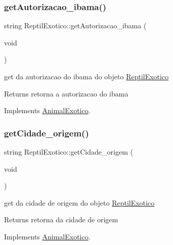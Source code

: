 \subsubsection{\texorpdfstring{getAutorizacao\_ibama()}{getAutorizacao\_ibama()}}
{\footnotesize\ttfamily string Reptil\+Exotico\+::get\+Autorizacao\+\_\+ibama (\begin{DoxyParamCaption}\item[{void}]{ }\end{DoxyParamCaption})\hspace{0.3cm}{\ttfamily [virtual]}}



get da autorizacao do ibama do objeto \mbox{\hyperlink{class_reptil_exotico}{Reptil\+Exotico}} 

\begin{DoxyReturn}{Returns}
retorna a autorizacao do ibama 
\end{DoxyReturn}


Implements \mbox{\hyperlink{class_animal_exotico}{Animal\+Exotico}}.

\mbox{\label{class_reptil_exotico_af1b3d94b7d6ca00f327a67b3e21a6eff}} 
\subsubsection{\texorpdfstring{getCidade\_origem()}{getCidade\_origem()}}
{\footnotesize\ttfamily string Reptil\+Exotico\+::get\+Cidade\+\_\+origem (\begin{DoxyParamCaption}\item[{void}]{ }\end{DoxyParamCaption})\hspace{0.3cm}{\ttfamily [virtual]}}



get da cidade de origem do objeto \mbox{\hyperlink{class_reptil_exotico}{Reptil\+Exotico}} 

\begin{DoxyReturn}{Returns}
retorna da cidade de origem 
\end{DoxyReturn}


Implements \mbox{\hyperlink{class_animal_exotico}{Animal\+Exotico}}.

\mbox{\label{class_reptil_exotico_a99f779d15b33ab9c8d0506d4e5b8af6e}} 
